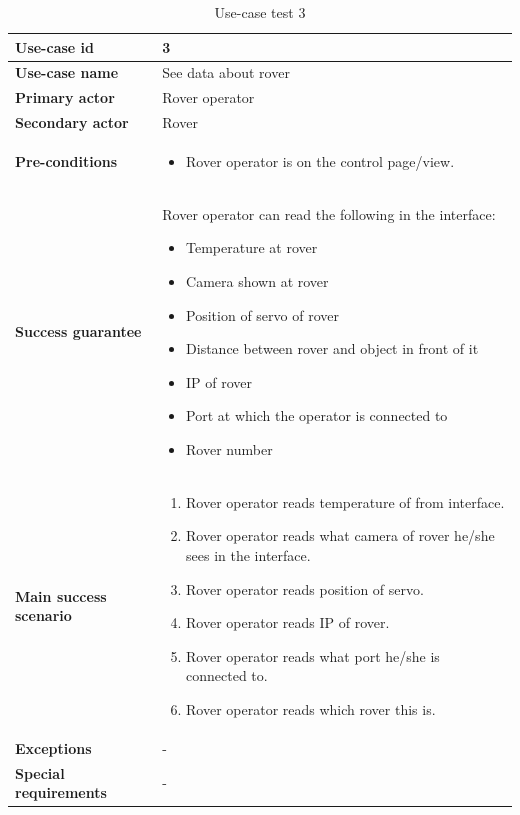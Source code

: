 \documentclass[12pt]{article}
\begin{document}
	\begin{table}[H]
	\centering
	\begin{tabularx}{\linewidth}{|X|X|}
		\hline
		\textbf{Use-case id} &3\\
		\hline
		\textbf{Use-case name} &See data about rover\\
		\hline
		\textbf{Primary actor} &Rover operator\\
		\hline
		\textbf{Secondary actor} &Rover\\
		\hline
		\textbf{Pre-conditions} &\begin{itemize}
			\item Rover operator is on the control page/view.
		\end{itemize}\\
		\hline
		\textbf{Success guarantee} &Rover operator can read the following in the interface:
		\begin{itemize}
			\item Temperature at rover
			\item Camera shown at rover
			\item Position of servo of rover
			\item Distance between rover and object in front of it
			\item IP of rover
			\item Port at which  the operator is connected to
			\item Rover number	
		\end{itemize}
		\\
		\hline
		\textbf{Main success scenario} &\begin{enumerate}
			\item Rover operator reads temperature of from interface.
			\item Rover operator reads what camera of rover he/she sees in the interface.
			\item Rover operator reads position of servo.
			\item Rover operator reads IP of rover.
			\item Rover operator reads what port he/she is connected to.
			\item Rover operator reads which rover this is.	
		\end{enumerate}\\
		\hline
		\textbf{Exceptions} &-\\
		\hline
		\textbf{Special requirements} &-\\
		\hline
		\end{tabularx}
		\caption{Use-case test 3}
		\label{table:Use-case test 3}   
	\end{table}
\end{document}
